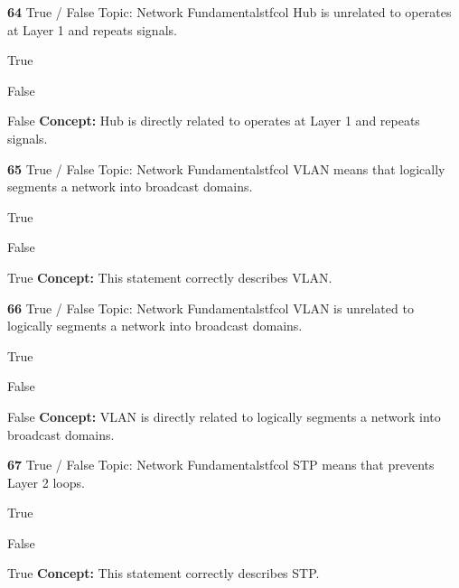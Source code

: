 \documentclass[10pt,a4paper]{article}
\begin{document}
\begin{qcard}{\color{white}\textbf{64} \hfill \small True / False \textbar{} Topic: Network Fundamentals}{tfcol}
Hub is unrelated to operates at Layer 1 and repeats signals.

\begin{qoptions}
\item True
\item False
\end{qoptions}
\begin{explainbox}{False}
\textbf{Concept:} Hub is directly related to operates at Layer 1 and repeats signals.
\end{explainbox}
\end{qcard}

\begin{qcard}{\color{white}\textbf{65} \hfill \small True / False \textbar{} Topic: Network Fundamentals}{tfcol}
VLAN means that logically segments a network into broadcast domains.

\begin{qoptions}
\item True
\item False
\end{qoptions}
\begin{explainbox}{True}
\textbf{Concept:} This statement correctly describes VLAN.
\end{explainbox}
\end{qcard}

\begin{qcard}{\color{white}\textbf{66} \hfill \small True / False \textbar{} Topic: Network Fundamentals}{tfcol}
VLAN is unrelated to logically segments a network into broadcast domains.

\begin{qoptions}
\item True
\item False
\end{qoptions}
\begin{explainbox}{False}
\textbf{Concept:} VLAN is directly related to logically segments a network into broadcast domains.
\end{explainbox}
\end{qcard}

\begin{qcard}{\color{white}\textbf{67} \hfill \small True / False \textbar{} Topic: Network Fundamentals}{tfcol}
STP means that prevents Layer 2 loops.

\begin{qoptions}
\item True
\item False
\end{qoptions}
\begin{explainbox}{True}
\textbf{Concept:} This statement correctly describes STP.
\end{explainbox}
\end{qcard}
\end{document}
